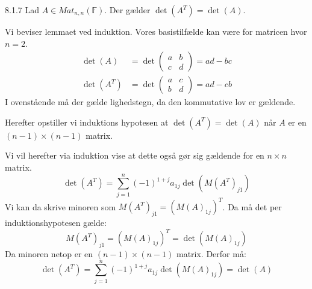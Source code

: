 \begin{lemma}{8.1.7}
	Lad $A \in Mat_{n,n}(\mathbb{F})$. Der gælder $\det(A^T) = \det(A)$.
\end{lemma}

\begin{bevis}
	Vi beviser lemmaet ved induktion. Vores basistilfælde kan være for matricen 
	hvor $n = 2$.
	\begin{align*}
		\det(A) &= \det\begin{pmatrix}
			a & b \\
			c & d
		\end{pmatrix} = ad - bc\\
		\det(A^T) &= \det\begin{pmatrix}
			a & c \\
			b & d
		\end{pmatrix} = ad - cb
	\end{align*}
	I ovenstående må der gælde lighedstegn, da den kommutative lov er gældende.
	
	\noindent Herefter opstiller vi induktions hypotesen at $\det(A^T) = 
	\det(A)$ når $A$ er en $(n-1) \times (n-1)$ matrix.
	
	\noindent Vi vil herefter via induktion vise at dette også gør sig gældende
	for en $n \times n$ matrix.
	\[
		\det(A^T) = \sum_{j=1}^{n}(-1)^{1+j}a_{1j}\det(M(A^T)_{j1})
	\]
	Vi kan da skrive minoren som $M(A^T)_{j1} = (M(A)_{1j})^T$. Da må det per 
	induktionshypotesen gælde:
	\[
		M(A^T)_{j1} = (M(A)_{1j})^T = \det(M(A)_{1j})
	\]
	Da minoren netop er en $(n-1) \times (n-1)$ matrix. Derfor må:
	\[
		\det(A^T) = \sum_{j=1}^{n}(-1)^{1+j}a_{1j}\det(M(A)_{1j}) = \det(A)
	\]
\end{bevis}
